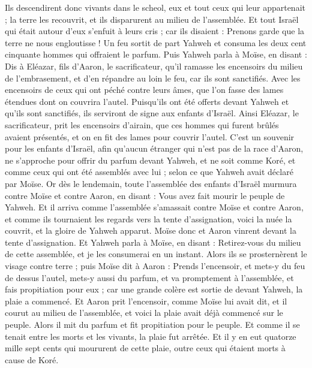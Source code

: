\begin{multicols}{2}
Ils descendirent donc vivants dans le scheol, eux et tout ceux qui leur appartenait ; la terre les recouvrit, et ils disparurent au milieu de l'assemblée.
Et tout Israël qui était autour d'eux s'enfuit à leurs cris ; car ils disaient : Prenons garde que la terre ne nous engloutisse !
Un feu sortit de part Yahweh et consuma les deux cent cinquante hommes qui offraient le parfum.
Puis Yahweh parla à Moïse, en disant :
Dis à Eléazar, fils d'Aaron, le sacrificateur, qu’il ramasse les encensoirs du milieu de l’embrasement, et d'en répandre au loin le feu, car ils sont sanctifiés.
Avec les encensoirs de ceux qui ont péché contre leurs âmes, que l'on fasse des lames étendues dont on couvrira l'autel. Puisqu'ils ont été offerts devant Yahweh et qu'ils sont sanctifiés, ils serviront de signe aux enfants d'Israël.
Ainsi Eléazar, le sacrificateur, prit les encensoirs d'airain, que ces hommes qui furent brûlés avaient présentés, et on en fit des lames pour couvrir l'autel.
C'est un souvenir pour les enfants d'Israël, afin qu'aucun étranger qui n’est pas de la race d'Aaron, ne s'approche pour offrir du parfum devant Yahweh, et ne soit comme Koré, et comme ceux qui ont été assemblés avec lui ; selon ce que Yahweh avait déclaré par Moïse.
Or dès le lendemain, toute l'assemblée des enfants d'Israël murmura contre Moïse et contre Aaron, en disant : Vous avez fait mourir le peuple de Yahweh.
Et il arriva comme l'assemblée s'amassait contre Moïse et contre Aaron, et comme ils tournaient les regards vers la tente d'assignation, voici la nuée la couvrit, et la gloire de Yahweh apparut.
Moïse donc et Aaron vinrent devant la tente d'assignation.
Et Yahweh parla à Moïse, en disant :
Retirez-vous du milieu de cette assemblée, et je les consumerai en un instant. Alors ils se prosternèrent le visage contre terre ;
puis Moïse dit à Aaron : Prends l'encensoir, et mets-y du feu de dessus l'autel, mets-y aussi du parfum, et va promptement à l'assemblée, et fais propitiation pour eux ; car une grande colère est sortie de devant Yahweh, la plaie a commencé.
Et Aaron prit l'encensoir, comme Moïse lui avait dit, et il courut au milieu de l'assemblée, et voici la plaie avait déjà commencé sur le peuple. Alors il mit du parfum et fit propitiation pour le peuple.
Et comme il se tenait entre les morts et les vivants, la plaie fut arrêtée.
Et il y en eut quatorze mille sept cents qui moururent de cette plaie, outre ceux qui étaient morts à cause de Koré.

\end{multicols}
